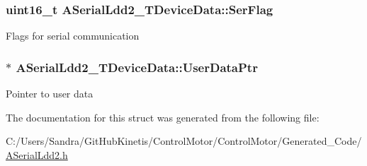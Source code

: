 \subsubsection[{\texorpdfstring{Ser\+Flag}{SerFlag}}]{\setlength{\rightskip}{0pt plus 5cm}uint16\+\_\+t A\+Serial\+Ldd2\+\_\+\+T\+Device\+Data\+::\+Ser\+Flag}\hypertarget{struct_a_serial_ldd2___t_device_data_a3a23d8d86c35f325643a62974866594f}{}\label{struct_a_serial_ldd2___t_device_data_a3a23d8d86c35f325643a62974866594f}
Flags for serial communication 
\subsubsection[{\texorpdfstring{User\+Data\+Ptr}{UserDataPtr}}]{$\ast$ A\+Serial\+Ldd2\+\_\+\+T\+Device\+Data\+::\+User\+Data\+Ptr}\hypertarget{struct_a_serial_ldd2___t_device_data_a5845eb75d51c879a652b884f6c71e8a3}{}\label{struct_a_serial_ldd2___t_device_data_a5845eb75d51c879a652b884f6c71e8a3}
Pointer to user data 

The documentation for this struct was generated from the following file\+:\begin{DoxyCompactItemize}
\item 
C\+:/\+Users/\+Sandra/\+Git\+Hub\+Kinetis/\+Control\+Motor/\+Control\+Motor/\+Generated\+\_\+\+Code/\hyperlink{_a_serial_ldd2_8h}{A\+Serial\+Ldd2.\+h}\end{DoxyCompactItemize}
